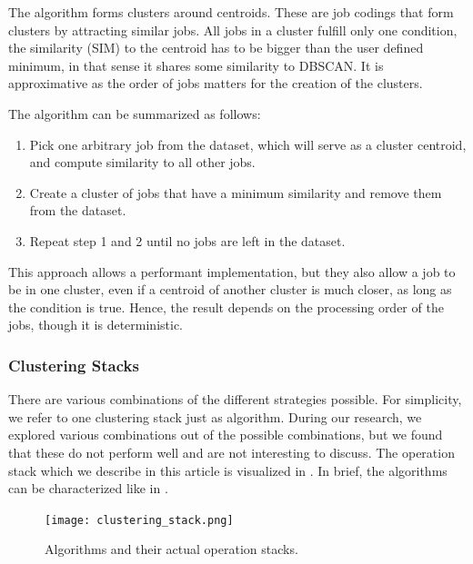 \documentclass{jhps}
\begin{document}
The algorithm forms clusters around centroids.
These are job codings that form clusters by attracting similar jobs.
All jobs in a cluster fulfill only one condition, the similarity (SIM) to the centroid has to be bigger than the user defined minimum, in that sense it shares some similarity to DBSCAN.
It is approximative as the order of jobs matters for the creation of the clusters.

The algorithm can be summarized as follows:
\begin{enumerate}
 \item Pick one arbitrary job from the dataset, which will serve as a cluster centroid, and compute similarity to all other jobs.
 \item Create a cluster of jobs that have a minimum similarity and remove them from the dataset.
 \item Repeat step 1 and 2 until no jobs are left in the dataset.
\end{enumerate}

This approach allows a performant implementation, but they also allow a job to be in one cluster, even if a centroid of another cluster is much closer, as long as the condition is true.
Hence, the result depends on the processing order of the jobs, though it is deterministic.


\subsubsection{Clustering Stacks}
There are various combinations of the different strategies possible.
For simplicity, we refer to one clustering stack just as algorithm.
During our research, we explored various combinations out of the possible combinations, but we found that these do not perform well and are not interesting to discuss.
The operation stack which we describe in this article is visualized in .
In brief, the algorithms can be characterized like in .

\begin{figure}[ht]
  \centering
  \texttt{[image: clustering\_stack.png]}
  \caption{Algorithms and their actual operation stacks.}
  \label{fig:clustering_stacks}
\end{figure}
\end{document}
